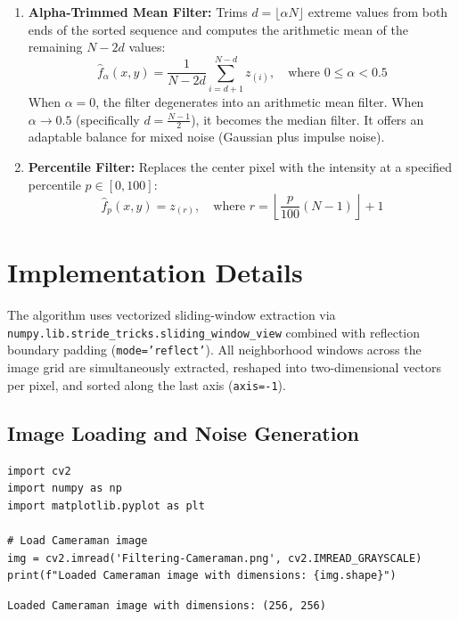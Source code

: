 \documentclass[12pt]{article}
\begin{document}
\begin{enumerate}
    \item \textbf{Alpha-Trimmed Mean Filter:} Trims $d = \lfloor \alpha N \rfloor$ extreme values from both ends of the sorted sequence and computes the arithmetic mean of the remaining $N - 2d$ values:
    \begin{equation}
        \hat{f}_{\alpha}(x, y) = \frac{1}{N - 2d} \sum_{i=d+1}^{N-d} z_{(i)}, \quad \text{where } 0 \le \alpha < 0.5
    \end{equation}
    When $\alpha = 0$, the filter degenerates into an arithmetic mean filter. When $\alpha \to 0.5$ (specifically $d = \frac{N-1}{2}$), it becomes the median filter. It offers an adaptable balance for mixed noise (Gaussian plus impulse noise).

    \item \textbf{Percentile Filter:} Replaces the center pixel with the intensity at a specified percentile $p \in [0, 100]$:
    \begin{equation}
        \hat{f}_{p}(x, y) = z_{(r)}, \quad \text{where } r = \left\lfloor \frac{p}{100}(N-1) \right\rfloor + 1
    \end{equation}
\end{enumerate}

\section{Implementation Details}
The algorithm uses vectorized sliding-window extraction via \texttt{numpy.lib.stride\_tricks.sliding\_window\_view} combined with reflection boundary padding (\texttt{mode='reflect'}). All neighborhood windows across the image grid are simultaneously extracted, reshaped into two-dimensional vectors per pixel, and sorted along the last axis (\texttt{axis=-1}).

\subsection{Image Loading and Noise Generation}
\begin{lstlisting}[style=code]
import cv2
import numpy as np
import matplotlib.pyplot as plt

# Load Cameraman image
img = cv2.imread('Filtering-Cameraman.png', cv2.IMREAD_GRAYSCALE)
print(f"Loaded Cameraman image with dimensions: {img.shape}")
\end{lstlisting}

\begin{lstlisting}[style=output]
Loaded Cameraman image with dimensions: (256, 256)
\end{lstlisting}
\end{document}
